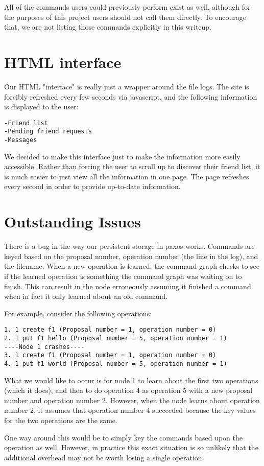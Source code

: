 \documentclass[11pt]{article}
\begin{document}
All of the commands users could previously perform exist as well, although for the purposes of this project users should not call them directly. To encourage that, we are not listing those commands explicitly in this writeup.

\section{HTML interface}

Our HTML "interface" is really just a wrapper around the file logs. The site is forcibly refreshed every few seconds via javascript, and the following information is displayed to the user:

\begin{verbatim}
-Friend list
-Pending friend requests
-Messages
\end{verbatim}

We decided to make this interface just to make the information more easily accessible. Rather than forcing the user to scroll up to discover their friend list, it is much easier to just view all the information in one page. The page refreshes every second in order to provide up-to-date information.

\section{Outstanding Issues}

There is a bug in the way our persistent storage in paxos works. Commands are keyed based on the proposal number, operation number (the line in the log), and the filename. When a new operation is learned, the command graph checks to see if the learned operation is something the command graph was waiting on to finish. This can result in the node erroneously assuming it finished a command when in fact it only learned about an old command.

For example, consider the following operations:
\begin{verbatim}
1. 1 create f1 (Proposal number = 1, operation number = 0)
2. 1 put f1 hello (Proposal number = 5, operation number = 1)
----Node 1 crashes----
3. 1 create f1 (Proposal number = 1, operation number = 0)
4. 1 put f1 world (Proposal number = 5, operation number = 1)
\end{verbatim}

What we would like to occur is for node 1 to learn about the first two operations (which it does), and then to do operation 4 as operation 5 with a new proposal number and operation number 2. However, when the node learns about operation number 2, it assumes that operation number 4 succeeded because the key values for the two operations are the same. 

One way around this would be to simply key the commands based upon the operation as well. However, in practice this exact situation is so unlikely that the additional overhead may not be worth losing a single operation. 
\end{document}
